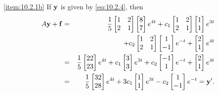 \documentclass{ximera}
\begin{document}
\begin{example}
\begin{explanation}
\ref{item:10.2.1b}
If ${\bf y}$ is given by \eqref{eq:10.2.4}, then
\begin{eqnarray*}
A{\bf y}+{\bf f}&=&
\frac{1}{5}\begin{bmatrix}1&2\\2&1\end{bmatrix}\begin{bmatrix}8\\7\end{bmatrix}e^{4t}+
c_1\begin{bmatrix}1&2\\2&1\end{bmatrix}\begin{bmatrix}1\\1\end{bmatrix}e^{3t}\\
&&+c_2\begin{bmatrix}1&2\\2&1\end{bmatrix}\begin{bmatrix}1\\-1\end{bmatrix}e^{-t}
+\begin{bmatrix}2\\1\end{bmatrix}e^{4t}\\
&=&\frac{1}{5}\begin{bmatrix}22\\23\end{bmatrix}e^{4t}+c_1\begin{bmatrix}3\\3\end{bmatrix}e^{3t}+c_2\begin{bmatrix}-1\\1\end{bmatrix}e^{-t}
+\begin{bmatrix}2\\1\end{bmatrix}e^{4t}\\
&=&\frac{1}{5}\begin{bmatrix}32\\28\end{bmatrix}e^{4t}+3c_1\begin{bmatrix}1\\1\end{bmatrix}e^{3t}-c_2\begin{bmatrix}1\\-1\end{bmatrix}e^{-t}
={\bf y}'.
\end{eqnarray*}


\end{explanation}
\end{example}
\end{document}
